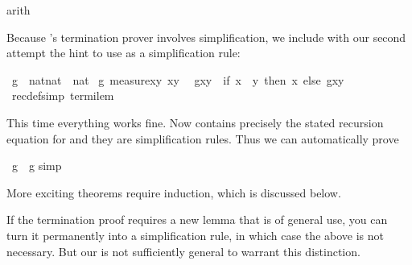 \begin{isabellebody}
arith{\isacharparenright}\isanewline
{}%
\begin{isamarkuptext}%
\noindent
Because 's termination prover involves simplification,
we include with our second attempt the hint to use  as
a simplification rule:%
\end{isamarkuptext}%
\ g\ {\isacharcolon}{\isacharcolon}\ {\isachardoublequote}nat{\isasymtimes}nat\ {\isasymRightarrow}\ nat{\isachardoublequote}\isanewline
{}\ g\ {\isachardoublequote}measure{\isacharparenleft}{\isasymlambda}{\isacharparenleft}x{\isacharcomma}y{\isacharparenright}{\isachardot}\ x{\isacharminus}y{\isacharparenright}{\isachardoublequote}\isanewline
\ \ {\isachardoublequote}g{\isacharparenleft}x{\isacharcomma}y{\isacharparenright}\ {\isacharequal}\ {\isacharparenleft}if\ x\ {\isasymle}\ y\ then\ x\ else\ g{\isacharparenleft}x{\isacharcomma}y{\isacharplus}{}{\isacharparenright}{\isacharparenright}{\isachardoublequote}\isanewline
{\isacharparenleft}\ recdef{\isacharunderscore}simp{\isacharcolon}\ termi{\isacharunderscore}lem{\isacharparenright}%
\begin{isamarkuptext}%
\noindent
This time everything works fine. Now  contains precisely
the stated recursion equation for  and they are simplification
rules. Thus we can automatically prove%
\end{isamarkuptext}%
\ {\isachardoublequote}g{\isacharparenleft}{}{\isacharcomma}{}{\isacharparenright}\ {\isacharequal}\ g{\isacharparenleft}{}{\isacharcomma}{}{\isacharparenright}{\isachardoublequote}\isanewline
{}simp{\isacharparenright}\isanewline
{}%
\begin{isamarkuptext}%
\noindent
More exciting theorems require induction, which is discussed below.

If the termination proof requires a new lemma that is of general use, you can
turn it permanently into a simplification rule, in which case the above
 is not necessary. But our  is not
sufficiently general to warrant this distinction.


\end{isamarkuptext}
\end{isabellebody}
